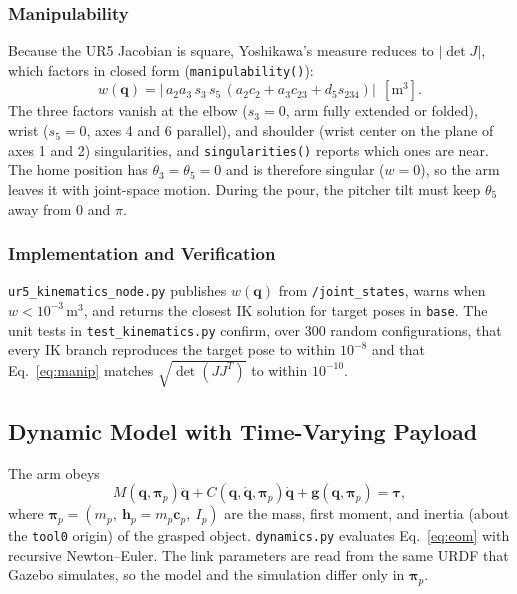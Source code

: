 \documentclass[conference]{IEEEtran}
\begin{document}
\subsubsection{Manipulability}
Because the UR5 Jacobian is square, Yoshikawa's measure reduces to $\lvert\det J\rvert$, which factors 
in closed form (\texttt{manipulability()}):
\begin{equation}
    w(\mathbf q)=\bigl|\,a_2a_3\,s_3\,s_5\,
       (a_2c_2+a_3c_{23}+d_5s_{234})\bigr|\ \ [\text{m}^3].
    \label{eq:manip}
\end{equation}
The three factors vanish at the elbow ($s_3=0$, arm fully extended or folded), wrist ($s_5=0$, axes 
4 and 6 parallel), and shoulder (wrist center on the plane of axes 1 and 2) singularities, and
\texttt{singularities()} reports which ones are near. The home position has 
$\theta_3=\theta_5=0$ and is therefore singular ($w=0$), so the arm leaves it with joint-space 
motion. During the pour, the pitcher tilt must keep $\theta_5$ away from $0$ and $\pi$.

\subsubsection{Implementation and Verification}
\texttt{ur5\_kinematics\_node.py} publishes $w(\mathbf q)$ from \texttt{/joint\_states}, warns when 
$w<10^{-3}$\,m$^3$, and returns the closest IK solution for target poses in \texttt{base}. The unit 
tests in \texttt{test\_kinematics.py} confirm, over 300 random configurations, that every IK branch 
reproduces the target pose to within $10^{-8}$ and that Eq.~\eqref{eq:manip} matches 
$\sqrt{\det(JJ^T)}$ to within $10^{-10}$.

\subsection{Dynamic Model with Time-Varying Payload}
The arm obeys
\begin{equation}
    M(\mathbf q,\boldsymbol\pi_p)\ddot{\mathbf q}
    + C(\mathbf q,\dot{\mathbf q},\boldsymbol\pi_p)\dot{\mathbf q}
    + \mathbf g(\mathbf q,\boldsymbol\pi_p) = \boldsymbol\tau ,
    \label{eq:eom}
\end{equation}
where $\boldsymbol\pi_p=(m_p,\ \mathbf h_p=m_p\mathbf c_p,\ I_p)$ are the mass, first moment, and 
inertia (about the \texttt{tool0} origin) of the grasped object. \texttt{dynamics.py} evaluates 
Eq.~\eqref{eq:eom} with recursive Newton--Euler. The link parameters are read from the same URDF
that Gazebo simulates, so the model and the simulation differ only in $\boldsymbol\pi_p$.
\end{document}
